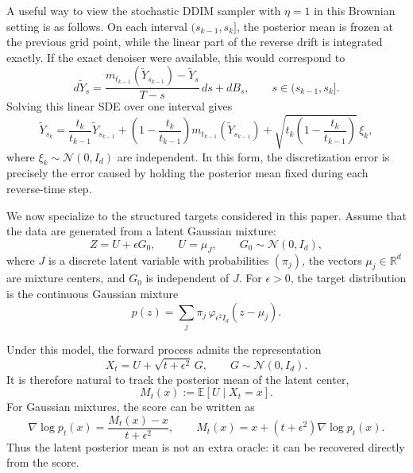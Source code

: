 \documentclass[11pt]{article}
\newcommand{\R}{\mathbb{R}}
\newcommand{\E}{\mathbb{E}}
\newcommand{\eps}{\epsilon}
\begin{document}
A useful way to view the stochastic DDIM sampler with $\eta=1$ in this Brownian setting is as follows. On each interval $(s_{k-1},s_k]$, the posterior mean is frozen at the previous grid point, while the linear part of the reverse drift is integrated exactly. If the exact denoiser were available, this would correspond to
\[
    d\widetilde Y_s
    =
    \frac{
    m_{t_{k-1}}(\widetilde Y_{s_{k-1}})-\widetilde Y_s
    }{T-s}\,ds+dB_s,
    \qquad
    s\in(s_{k-1},s_k].
\]
Solving this linear SDE over one interval gives
\[
    \widetilde Y_{s_k}
    =
    \frac{t_k}{t_{k-1}}\widetilde Y_{s_{k-1}}
    +
    \left(1-\frac{t_k}{t_{k-1}}\right)
    m_{t_{k-1}}(\widetilde Y_{s_{k-1}})
    +
    \sqrt{t_k\left(1-\frac{t_k}{t_{k-1}}\right)}\,\xi_k,
\]
where $\xi_k\sim\mathcal N(0,I_d)$ are independent. In this form, the discretization error is precisely the error caused by holding the posterior mean fixed during each reverse-time step.

We now specialize to the structured targets considered in this paper. Assume that the data are generated from a latent Gaussian mixture:
\[
    Z=U+\eps G_0,
    \qquad
    U=\mu_J,
    \qquad
    G_0\sim\mathcal N(0,I_d),
\]
where $J$ is a discrete latent variable with probabilities $(\pi_j)$, the vectors $\mu_j\in\R^d$ are mixture centers, and $G_0$ is independent of $J$. For $\eps>0$, the target distribution is the continuous Gaussian mixture
\[
    p(z)=\sum_j \pi_j\,\varphi_{\eps^2 I_d}(z-\mu_j).
\]


Under this model, the forward process admits the representation
\[
    X_t=U+\sqrt{t+\eps^2}\,G,
    \qquad
    G\sim\mathcal N(0,I_d).
\]
It is therefore natural to track the posterior mean of the latent center,
\[
    M_t(x):=\E[U\mid X_t=x].
\]
For Gaussian mixtures, the score can be written as
\[
    \nabla\log p_t(x)
    =
    \frac{M_t(x)-x}{t+\eps^2},
    \qquad
    M_t(x)=x+(t+\eps^2)\nabla\log p_t(x).
\]
Thus the latent posterior mean is not an extra oracle: it can be recovered directly from the score.
\end{document}
